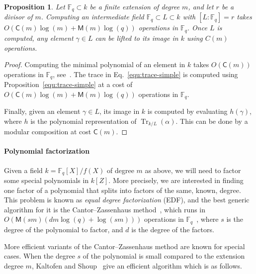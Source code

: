 \documentclass[12pt]{article}
\theoremstyle{plain}
\newtheorem{proposition}[theorem]{Proposition}
\theoremstyle{definition}
\DeclareMathOperator{\trace}{Tr} %
\def\F{\ensuremath{\mathbb{F}}}
\def\MM{\ensuremath{\mathsf{M}}}
\def\CC{\ensuremath{\mathsf{C}}}
\newcounter{algorithm}
\begin{document}
\begin{proposition}
	\label{prop:subfield}
	Let $\F_q \subset k$ be a finite extension of degree $m$, and
        let $r$ be a divisor of $m$.  Computing an intermediate field
        $\F_q \subset L \subset k$ with $[L:\F_q]=r$ takes
        $O(\CC(m)\log(m) + \MM(m)\log(q))$ operations in $\F_q$.  Once
        $L$ is computed, any element $\gamma\in L$ can be lifted to
        its image in $k$ using $C(m)$ operations.
\end{proposition}
\begin{proof}
	Computing the minimal polynomial of an element in $k$ takes $O(\CC(m))$ operations in $\F_q$, 
	see~\cite{shoup93}. %
        The trace in Eq.~\eqref{equ:trace-simple} is computed using Proposition~\ref{equ:trace-simple}
        at a cost of $O(\CC(m)\log(m)+\MM(m)\log(q))$ operations in $\F_q$.

        Finally, given an element $\gamma\in L$, its image in $k$ is
        computed by evaluating $h(\gamma)$, where $h$ is the
        polynomial representation of $\trace_{k/L}(\alpha)$. This can
        be done by a modular composition at cost $\CC(m)$.
\end{proof}


\paragraph{Polynomial factorization}
Given a field $k = \F_q[X]/f(X)$ of degree $m$ as above, we will need to
factor some special polynomials in $k[Z]$. More precisely, we are
interested in finding one factor of a polynomial that splits into
factors of the same, known, degree. This problem is known as
\emph{equal degree factorization} (EDF), and the best generic algorithm for
it is the Cantor--Zassenhaus method~\cite{cantor1981,von1992computing},
which runs in $O(\MM(sm)(dm\log(q) + \log(sm)))$ operations in
$\F_q$~\cite[Th.~14.9]{vzGG}, where $s$ is the degree of the
polynomial to factor, and $d$ is the degree of the factors.

More efficient variants of the Cantor--Zassenhaus method are known for
special cases. When the degree $s$ of the polynomial is small compared
to the extension degree $m$, Kaltofen and Shoup~\cite{kaltofen+shoup97} 
give an efficient algorithm which is as follows.
\end{document}
